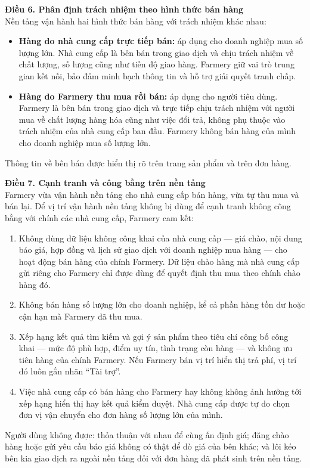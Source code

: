 \noindent\textbf{Điều 6. Phân định trách nhiệm theo hình thức bán hàng}\\
Nền tảng vận hành hai hình thức bán hàng với trách nhiệm khác nhau:
\begin{itemize}
    \item \textbf{Hàng do nhà cung cấp trực tiếp bán:} áp dụng cho doanh nghiệp
    mua số lượng lớn. Nhà cung cấp là bên bán trong giao dịch và chịu trách
    nhiệm về chất lượng, số lượng cũng như tiến độ giao hàng. Farmery giữ vai
    trò trung gian kết nối, bảo đảm minh bạch thông tin và hỗ trợ giải quyết
    tranh chấp.
    \item \textbf{Hàng do Farmery thu mua rồi bán:} áp dụng cho người tiêu dùng.
    Farmery là bên bán trong giao dịch và trực tiếp chịu trách nhiệm với người
    mua về chất lượng hàng hóa cũng như việc đổi trả, không phụ thuộc vào trách
    nhiệm của nhà cung cấp ban đầu. Farmery không bán hàng của mình cho doanh
    nghiệp mua số lượng lớn.
\end{itemize}
Thông tin về bên bán được hiển thị rõ trên trang sản phẩm và trên đơn hàng.

\noindent\textbf{Điều 7. Cạnh tranh và công bằng trên nền tảng}\\
Farmery vừa vận hành nền tảng cho nhà cung cấp bán hàng, vừa tự thu mua và
bán lại. Để vị trí vận hành nền tảng không bị dùng để cạnh tranh không công
bằng với chính các nhà cung cấp, Farmery cam kết:
\begin{enumerate}
    \item Không dùng dữ liệu không công khai của nhà cung cấp --- giá chào, nội
    dung báo giá, hợp đồng và lịch sử giao dịch với doanh nghiệp mua hàng ---
    cho hoạt động bán hàng của chính Farmery. Dữ liệu chào hàng mà nhà cung cấp
    gửi riêng cho Farmery chỉ được dùng để quyết định thu mua theo chính chào
    hàng đó.
    \item Không bán hàng số lượng lớn cho doanh nghiệp, kể cả phần hàng tồn dư
    hoặc cận hạn mà Farmery đã thu mua.
    \item Xếp hạng kết quả tìm kiếm và gợi ý sản phẩm theo tiêu chí công bố
    công khai --- mức độ phù hợp, điểm uy tín, tình trạng còn hàng --- và không
    ưu tiên hàng của chính Farmery. Nếu Farmery bán vị trí hiển thị trả phí,
    vị trí đó luôn gắn nhãn ``Tài trợ''.
    \item Việc nhà cung cấp có bán hàng cho Farmery hay không không ảnh hưởng
    tới xếp hạng hiển thị hay kết quả kiểm duyệt. Nhà cung cấp được tự do chọn
    đơn vị vận chuyển cho đơn hàng số lượng lớn của mình.
\end{enumerate}
Người dùng không được: thỏa thuận với nhau để cùng ấn định giá; đăng chào hàng
hoặc gửi yêu cầu báo giá không có thật để dò giá của bên khác; và lôi kéo bên
kia giao dịch ra ngoài nền tảng đối với đơn hàng đã phát sinh trên nền tảng.

